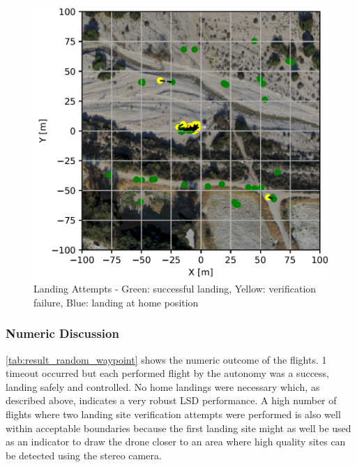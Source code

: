     \begin{figure}[h]
        \begin{center}
            \includegraphics[scale=0.5]{images/evaluation/landings_random_WP_GT.png}
            \caption{Landing Attempts - Green: successful landing, Yellow: verification failure, Blue: landing at home position}
            \label{fig:landing_attempts_random_WP}
        \end{center}
    \end{figure}

    \subsubsection{Numeric Discussion}
    \cref{tab:result_random_waypoint} shows the numeric outcome of the flights. 1 timeout occurred but each performed flight by the autonomy was a success, landing safely and controlled. No home landings were necessary which, as described above, indicates a very robust LSD performance. A high number of flights where two landing site verification attempts were performed is also well within acceptable boundaries because the first landing site might as well be used as an indicator to draw the drone closer to an area where high quality sites can be detected using the stereo camera.

